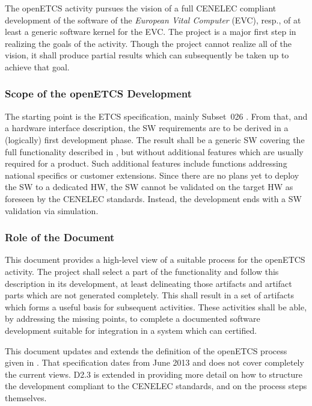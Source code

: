 \documentclass{template/openetcs_article}
\begin{document}
The openETCS activity pursues the vision of a full CENELEC
compliant development of the software of the \emph{European Vital
  Computer} (EVC), resp., of at least a generic software kernel for
the EVC.  The project is a major first step in realizing the
goals of the activity. Though the project cannot realize all of the
vision, it shall produce partial results which can subsequently be
taken up to achieve that goal.

\subsubsection{Scope of the openETCS Development}
\label{sec:scope-development}

The starting point is the ETCS specification, mainly Subset~026
\cite{subset-026:3.3.0}. From that, and a hardware interface
description, the SW requirements are to be derived in a (logically)
first development phase. The result shall be a generic SW covering the
full functionality described in \cite{subset-026:3.3.0}, but without
additional features which are usually required for a product. Such
additional features include functions addressing national specifics or
customer extensions. Since there are no plans yet to deploy the SW to
a dedicated HW, the SW cannot be validated on the target HW as
foreseen by the CENELEC standards. Instead, the development ends with
a SW validation via simulation.

\subsubsection{Role of the Document}
\label{sec:role-document}

This document provides a high-level view of a suitable process for the
openETCS activity. The project shall select a part of the
functionality and follow this description in its development, at least
delineating those artifacts and artifact parts which are not generated
completely. This shall result in a set of artifacts which forms a
useful basis for subsequent activities. These activities shall be
able, by addressing the missing points, to complete a documented
software development suitable for integration in a system which can
certified.

This document updates and extends the definition of the openETCS
process given in \cite{openETCS:D2.3}. That specification dates from
June 2013 and does not cover completely the current views. D2.3 is
extended in providing more detail on how to structure the development
compliant to the CENELEC standards, and on the process steps
themselves.
\end{document}
